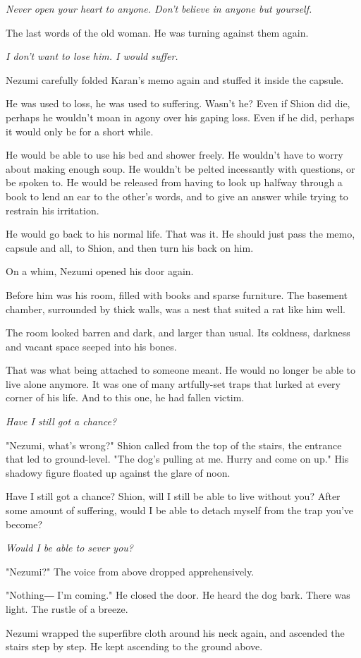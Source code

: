 \emph{Never open your heart to anyone. Don't believe in anyone but yourself.}

The last words of the old woman. He was turning against them again.

\emph{I don't want to lose him. I would suffer.}

Nezumi carefully folded Karan's memo again and stuffed it inside the
capsule.

He was used to loss, he was used to suffering. Wasn't he? Even if Shion
did die, perhaps he wouldn't moan in agony over his gaping loss. Even if
he did, perhaps it would only be for a short while.

He would be able to use his bed and shower freely. He wouldn't have to
worry about making enough soup. He wouldn't be pelted incessantly with
questions, or be spoken to. He would be released from having to look up
halfway through a book to lend an ear to the other's words, and to give
an answer while trying to restrain his irritation.

He would go back to his normal life. That was it. He should just pass
the memo, capsule and all, to Shion, and then turn his back on him.

On a whim, Nezumi opened his door again.

Before him was his room, filled with books and sparse furniture. The
basement chamber, surrounded by thick walls, was a nest that suited a
rat like him well.

The room looked barren and dark, and larger than usual. Its coldness,
darkness and vacant space seeped into his bones.

That was what being attached to someone meant. He would no longer be
able to live alone anymore. It was one of many artfully-set traps that
lurked at every corner of his life. And to this one, he had fallen
victim.

\emph{Have I still got a chance?}

"Nezumi, what's wrong?" Shion called from the top of the stairs, the
entrance that led to ground-level. "The dog's pulling at me. Hurry and
come on up." His shadowy figure floated up against the glare of noon.

Have I still got a chance? Shion, will I still be able to live without
you? After some amount of suffering, would I be able to detach myself
from the trap you've become?

\emph{Would I be able to sever you?}

"Nezumi?" The voice from above dropped apprehensively.

"Nothing― I'm coming." He closed the door. He heard the dog bark. There
was light. The rustle of a breeze.

Nezumi wrapped the superfibre cloth around his neck again, and ascended
the stairs step by step. He kept ascending to the ground above.